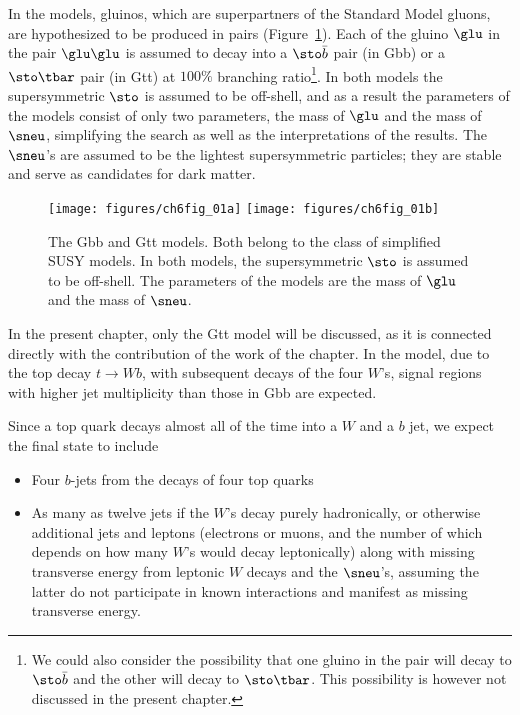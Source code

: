 In the models, gluinos, which are superpartners of the Standard Model gluons,
are hypothesized to be produced in pairs (Figure~\ref{f:gttfey}). Each of the
gluino $\glu$ in the pair $\glu\glu$ is assumed to decay into a $\sto\bar{b}$
pair (in Gbb) or a $\sto\tbar$ pair (in Gtt) at $100\%$ branching
ratio\footnote{We could also consider the possibility that one gluino in the
	pair will decay to $\sto\bar{b}$ and the other will decay to $\sto\tbar$. This
	possibility is however not discussed in the present chapter.}. In both models
the supersymmetric $\sto$ is assumed to be off-shell, and as a result the
parameters of the models consist of only two parameters, the mass of $\glu$ and
the mass of $\sneu$, simplifying the search as well as the interpretations of
the results. The $\sneu$'s are assumed to be the lightest supersymmetric
particles; they are stable and serve as candidates for dark matter.

\begin{figure}[H]
	\texttt{[image: figures/ch6fig\_01a]}
	\texttt{[image: figures/ch6fig\_01b]}
	\centering

	\caption{The Gbb and Gtt models. Both belong to the class of simplified SUSY
		models. In both models, the supersymmetric $\sto$ is assumed to be off-shell.
		The parameters of the models are the mass of $\glu$ and the mass of $\sneu$.}

	\label{f:gttfey}
\end{figure}

In the present chapter, only the Gtt model will be discussed, as it is
connected directly with the contribution of the work of the chapter. In the
model, due to the top decay $t\to Wb$, with subsequent decays of the four
$W$'s, signal regions with higher jet multiplicity than those in Gbb are
expected.


Since a top quark decays almost all of
the time into a $W$ and a $b$ jet,  we expect the final state to include

\begin{itemize}[label=]

	\item Four $b$-jets from the decays of four top quarks

	\item As many as twelve jets if the $W$'s decay purely hadronically, or
	      otherwise additional jets and leptons (electrons or muons, and the number of
	      which depends on how many $W$'s would decay leptonically) along with missing
	      transverse energy from leptonic $W$ decays and the $\sneu$'s, assuming the
	      latter do not participate in known interactions and manifest as missing
	      transverse energy.

\end{itemize}

